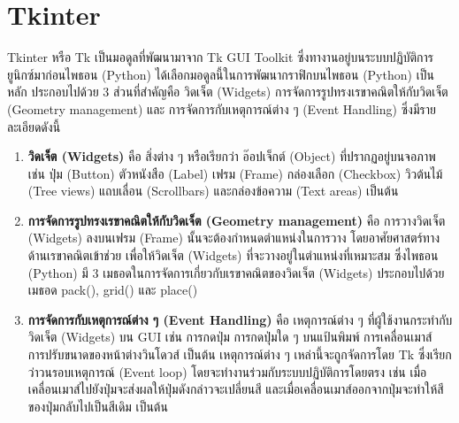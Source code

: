 \section{Tkinter}
Tkinter หรือ Tk เป็นมอดูลที่พัฒนามาจาก Tk GUI Toolkit ซึ่งทางานอยู่บนระบบปฏิบัติการยูนิกซ์มาก่อนไพธอน (Python) ได้เลือกมอดูลนี้ในการพัฒนากราฟิกบนไพธอน (Python) เป็นหลัก
ประกอบไปด้วย 3 ส่วนที่สำคัญคือ วิดเจ็ต (Widgets) การจัดการรูปทรงเรขาคณิตให้กับวิดเจ็ต (Geometry management) และ การจัดการกับเหตุการณ์ต่าง ๆ (Event Handling) \cite{Tkinter} ซึ่งมีรายละเอียดดังนี้
\begin{enumerate}
  \item \textbf{วิดเจ็ต (Widgets)} คือ สิ่งต่าง ๆ หรือเรียกว่า อ๊อปเจ็กต์ (Object) ที่ปรากฏอยู่บนจอภาพ เช่น ปุ่ม (Button) ตัวหนังสือ (Label) เฟรม (Frame) กล่องเลือก (Checkbox) 
  วิวต้นไม้ (Tree views) แถบเลื่อน (Scrollbars) และกล่องข้อความ (Text areas) เป็นต้น
  \item \textbf{การจัดการรูปทรงเรขาคณิตให้กับวิดเจ็ต (Geometry management)} คือ การวางวิดเจ็ต (Widgets) ลงบนเฟรม (Frame) นั้นจะต้องกำหนดตำแหน่งในการวาง 
  โดยอาศัยศาสตร์ทางด้านเรขาคณิตเข้าช่วย เพื่อให้วิดเจ็ต (Widgets) ที่จะวางอยู่ในตำแหน่งที่เหมาะสม ซึ่งไพธอน (Python) มี 3 เมธอดในการจัดการเกี่ยวกับเรขาคณิตของวิดเจ็ต (Widgets) 
  ประกอบไปด้วยเมธอด pack(), grid() และ place()
  \item \textbf{การจัดการกับเหตุการณ์ต่าง ๆ (Event Handling)} คือ เหตุการณ์ต่าง ๆ ที่ผู้ใช้งานกระทำกับวิดเจ็ต (Widgets) บน GUI เช่น การกดปุ่ม การกดปุ่มใด ๆ บนแป้นพิมพ์ 
  การเคลื่อนเมาส์ การปรับขนาดของหน้าต่างวินโดวส์ เป็นต้น เหตุการณ์ต่าง ๆ เหล่านี้จะถูกจัดการโดย Tk ซึ่งเรียกว่าวนรอบเหตุการณ์ (Event loop) โดยจะทำงานร่วมกับระบบปฏิบัติการโดยตรง 
  เช่น เมื่อเคลื่อนเมาส์ไปยังปุ่มจะส่งผลให้ปุ่มดังกล่าวจะเปลี่ยนสี และเมื่อเคลื่อนเมาส์ออกจากปุ่มจะทำให้สีของปุ่มกลับไปเป็นสีเดิม เป็นต้น
\end{enumerate}

